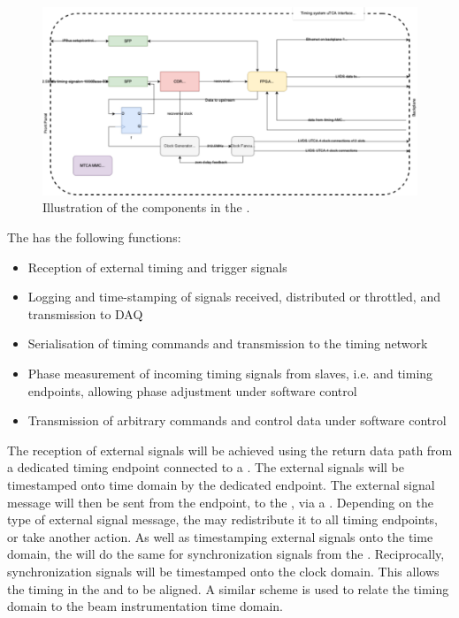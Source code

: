\documentclass{article}
\begin{document}
\begin{figure}[h]
\includegraphics[width=\textwidth]{mib_layout.pdf}
\caption{Illustration of the components in the .}
\label{fig:mib_layout}
\end{figure}

The  has the following functions:

\begin{itemize}
	\item Reception of external timing and trigger signals
	\item Logging and time-stamping of signals received, distributed or throttled, and transmission to DAQ
	\item Serialisation of timing commands and transmission to the timing network
	\item Phase measurement of incoming timing signals from slaves, i.e.  and timing endpoints, allowing phase adjustment under software control
	\item Transmission of arbitrary commands and control data under software control
\end{itemize}

The reception of external signals will be achieved using the return data path from a dedicated timing endpoint connected to a . The external signals will be timestamped onto  time domain by the dedicated endpoint. The external signal  message will then be sent from the endpoint, to the , via a . Depending on the type of external signal message, the  may redistribute it to all timing endpoints, or take another action. 
As well as timestamping external signals onto the  time domain, the  will do the same for  synchronization signals from the  . Reciprocally,  synchronization signals will be timestamped onto the  clock domain. This allows the timing in the  and   to be
aligned. A similar scheme is used to relate the  timing domain to the beam instrumentation  time domain.
\end{document}

